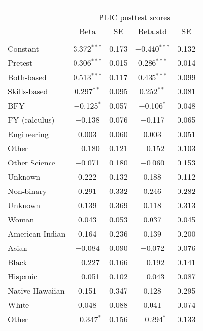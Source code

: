 
\begin{table}[!htbp] \centering 
  \caption{} 
  \label{} 
\begin{tabular}{@{\extracolsep{5pt}}lcccc} 
\\[-1.8ex]\hline \\[-1.8ex] 
\\[-1.8ex] & \multicolumn{4}{c}{PLIC posttest scores} \\ 
 & Beta & SE & Beta.std & SE \\ 
\hline \\[-1.8ex] 
 Constant & 3.372$^{***}$ & 0.173 & $-$0.440$^{***}$ & 0.132 \\ 
  Pretest & 0.306$^{***}$ & 0.015 & 0.286$^{***}$ & 0.014 \\ 
  Both-based & 0.513$^{***}$ & 0.117 & 0.435$^{***}$ & 0.099 \\ 
  Skills-based & 0.297$^{**}$ & 0.095 & 0.252$^{**}$ & 0.081 \\ 
  BFY & $-$0.125$^{*}$ & 0.057 & $-$0.106$^{*}$ & 0.048 \\ 
  FY (calculus) & $-$0.138 & 0.076 & $-$0.117 & 0.065 \\ 
  Engineering & 0.003 & 0.060 & 0.003 & 0.051 \\ 
  Other & $-$0.180 & 0.121 & $-$0.152 & 0.103 \\ 
  Other Science & $-$0.071 & 0.180 & $-$0.060 & 0.153 \\ 
  Unknown & 0.222 & 0.132 & 0.188 & 0.112 \\ 
  Non-binary & 0.291 & 0.332 & 0.246 & 0.282 \\ 
  Unknown & 0.139 & 0.369 & 0.118 & 0.313 \\ 
  Woman & 0.043 & 0.053 & 0.037 & 0.045 \\ 
  American Indian & 0.164 & 0.236 & 0.139 & 0.200 \\ 
  Asian & $-$0.084 & 0.090 & $-$0.072 & 0.076 \\ 
  Black & $-$0.227 & 0.166 & $-$0.192 & 0.141 \\ 
  Hispanic & $-$0.051 & 0.102 & $-$0.043 & 0.087 \\ 
  Native Hawaiian & 0.151 & 0.347 & 0.128 & 0.295 \\ 
  White & 0.048 & 0.088 & 0.041 & 0.074 \\ 
  Other & $-$0.347$^{*}$ & 0.156 & $-$0.294$^{*}$ & 0.133 \\ 

\end{tabular}
\end{table}
